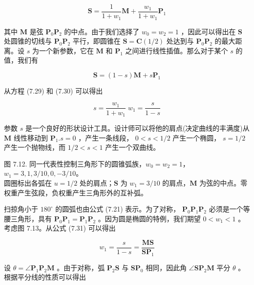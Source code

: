 \documentclass[../main.tex]{subfiles}
\begin{document}
\[
\mathbf{S} = \frac{1}{1 + {w}_{1}}\mathbf{M} + \frac{{w}_{1}}{1 + {w}_{1}}{\mathbf{P}}_{1} \tag{7.29}
\]

其中 \(\mathbf{M}\) 是弦 \({\mathbf{P}}_{0}{\mathbf{P}}_{2}\) 的中点。由于我们选择了 \({w}_{0} = {w}_{2} = 1\) ，因此可以得出在 \(\mathbf{S}\) 处圆锥的切线与 \({\mathbf{P}}_{0}{\mathbf{P}}_{2}\) 平行，即圆锥在 \(\mathbf{S} = \mathbf{C}\left( {1/2}\right)\) 处达到与 \({\mathbf{P}}_{0}{\mathbf{P}}_{2}\) 的最大距离。设 \(s\) 为一个新参数，它在 \(\mathbf{M}\) 和 \({\mathbf{P}}_{1}\) 之间进行线性插值。那么对于某个 \(s\) 的值，我们有

\[
\mathbf{S} = \left( {1 - s}\right) \mathbf{M} + s{\mathbf{P}}_{1} \tag{7.30}
\]

从方程 (7.29) 和 (7.30) 可以得出

\[
s = \frac{{w}_{1}}{1 + {w}_{1}}\;{w}_{1} = \frac{s}{1 - s} \tag{7.31}
\]

参数 \(s\) 是一个良好的形状设计工具。设计师可以将他的肩点(决定曲线的丰满度)从 \(\mathbf{M}\) 线性移动到 \({\mathbf{P}}_{1}.s = 0\) ，产生一条线段， \(0 < s < 1/2\) 产生一个椭圆， \(s = 1/2\) 产生一个抛物线，而 \(1/2 < s < 1\) 产生一个双曲线。

\begin{center}
\begin{minipage}{18cm}
\vspace*{.6\baselineskip}
\centering
{}
\par\smallskip
图 7.12. 同一代表性控制三角形下的圆锥弧族，$w_0=w_2=1$，$w_1=3,1,3/10,0,-3/10$。\\
圆圈标出各弧在 $u=1/2$ 处的肩点；$\mathbf S$ 为 $w_1=3/10$ 的肩点，$\mathbf M$ 为弦的中点。零权重产生弦段，负权重产生三角形外的互补弧。
\end{minipage}
\end{center}

扫掠角小于 \({180}^{ \circ  }\) 的圆弧也由公式 (7.21) 表示。为了对称， \({\mathbf{P}}_{0}{\mathbf{P}}_{1}{\mathbf{P}}_{2}\) 必须是一个等腰三角形，具有 \({\mathbf{P}}_{0}{\mathbf{P}}_{1} = {\mathbf{P}}_{1}{\mathbf{P}}_{2}\) 。因为圆是椭圆的特例，我们期望 \(0 < {w}_{1} < 1\) 。考虑图 7.13。从公式 (7.31) 可以得出

\[
{w}_{1} = \frac{s}{1 - s} = \frac{\mathbf{{MS}}}{{\mathbf{{SP}}}_{1}} \tag{7.32}
\]

设 \(\theta  = \angle {\mathbf{P}}_{1}{\mathbf{P}}_{2}\mathbf{M}\) 。由于对称，弧 \({\mathbf{P}}_{2}\mathbf{S}\) 与 \({\mathbf{{SP}}}_{0}\) 相同，因此角 \(\angle {\mathbf{{SP}}}_{2}\mathbf{M}\) 平分 \(\theta\) 。根据平分线的性质可以得出
\end{document}
